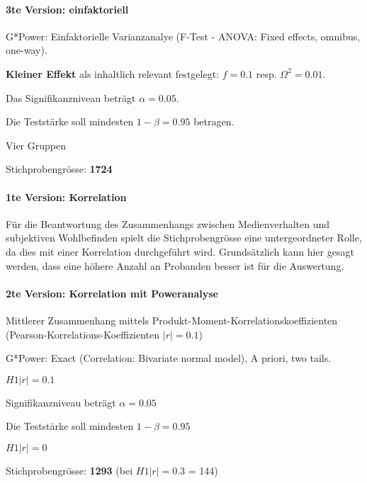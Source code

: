 \paragraph{3te Version: einfaktoriell}
\begin{APAitemize} 
    \item G*Power: Einfaktorielle Varianzanalye (F-Test - ANOVA: Fixed effects, omnibus, one-way).
    \item \textbf{Kleiner Effekt} als inhaltlich relevant festgelegt: $f = 0.1$ resp. $\Omega^2 = 0.01$.
    \item Das Signifikanzniveau beträgt $\alpha=0.05$. 
    \item Die Teststärke soll mindesten $1-\beta=0.95$ betragen.
    \item Vier Gruppen
    \item Stichprobengrösse: \textbf{1724}
\end{APAitemize}

\paragraph{1te Version: Korrelation}
Für die Beantwortung des Zusammenhangs zwischen Medienverhalten und subjektiven Wohlbefinden spielt die Stichprobengrösse eine untergeordneter Rolle, da dies mit einer Korrelation durchgeführt wird. Grundsätzlich kann hier gesagt werden, dass eine höhere Anzahl an Probanden besser ist für die Auswertung.

\paragraph{2te Version: Korrelation mit Poweranalyse}
\begin{APAitemize} 
    \item Mittlerer Zusammenhang mittels Produkt-Moment-Korrelationskoeffizienten (Pearson-Korrelations-Koeffizienten $|r|=0.1$)
    \item G*Power: Exact (Correlation: Bivariate normal model), A priori, two tails.
    \item $H1 |r|=0.1$
    \item Signifikanzniveau beträgt $\alpha=0.05$
    \item Die Teststärke soll mindesten $1-\beta=0.95$
    \item $H1 |r|=0$
    \item Stichprobengrösse: \textbf{1293} (bei $H1 |r|=0.3$ = 144)
\end{APAitemize}


